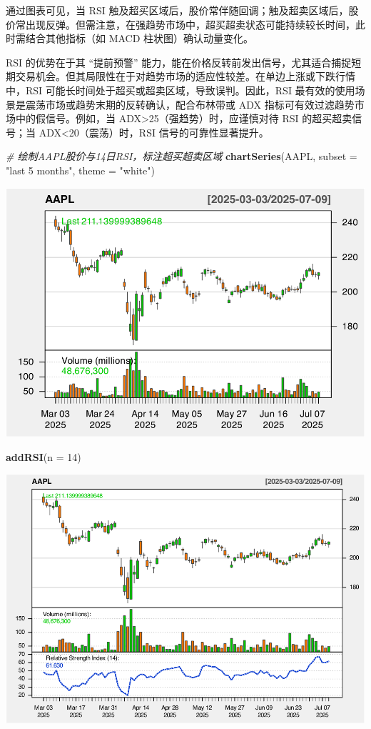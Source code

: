 \documentclass[]{ctexbook}
\newenvironment{Shaded}{\begin{snugshade}}{\end{snugshade}}
\newcommand{\AttributeTok}[1]{\textcolor[rgb]{0.13,0.29,0.53}{#1}}
\newcommand{\CommentTok}[1]{\textcolor[rgb]{0.56,0.35,0.01}{\textit{#1}}}
\newcommand{\DecValTok}[1]{\textcolor[rgb]{0.00,0.00,0.81}{#1}}
\newcommand{\FunctionTok}[1]{\textcolor[rgb]{0.13,0.29,0.53}{\textbf{#1}}}
\newcommand{\NormalTok}[1]{#1}
\newcommand{\StringTok}[1]{\textcolor[rgb]{0.31,0.60,0.02}{#1}}
\begin{document}
通过图表可见，当 RSI 触及超买区域后，股价常伴随回调；触及超卖区域后，股价常出现反弹。但需注意，在强趋势市场中，超买超卖状态可能持续较长时间，此时需结合其他指标（如 MACD 柱状图）确认动量变化。

RSI 的优势在于其 ``提前预警'' 能力，能在价格反转前发出信号，尤其适合捕捉短期交易机会。但其局限性在于对趋势市场的适应性较差。在单边上涨或下跌行情中，RSI 可能长时间处于超买或超卖区域，导致误判。因此，RSI 最有效的使用场景是震荡市场或趋势末期的反转确认，配合布林带或 ADX 指标可有效过滤趋势市场中的假信号。例如，当 ADX\textgreater25（强趋势）时，应谨慎对待 RSI 的超买超卖信号；当 ADX\textless20（震荡）时，RSI 信号的可靠性显著提升。

\begin{Shaded}
\begin{Highlighting}[]
\CommentTok{\# 绘制AAPL股价与14日RSI，标注超买超卖区域}
\FunctionTok{chartSeries}\NormalTok{(AAPL, }\AttributeTok{subset =} \StringTok{"last 5 months"}\NormalTok{, }\AttributeTok{theme =} \StringTok{"white"}\NormalTok{)}
\end{Highlighting}
\end{Shaded}

\includegraphics[width=0.9\linewidth]{quantmod_files/figure-latex/rsi_2-1}

\begin{Shaded}
\begin{Highlighting}[]
\FunctionTok{addRSI}\NormalTok{(}\AttributeTok{n =} \DecValTok{14}\NormalTok{)}
\end{Highlighting}
\end{Shaded}

\includegraphics[width=0.9\linewidth]{quantmod_files/figure-latex/rsi_2-2}
\end{document}
